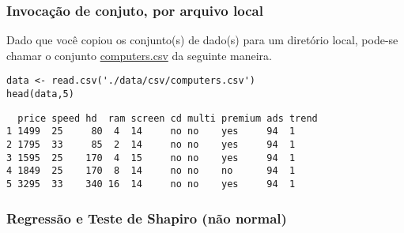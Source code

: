 \documentclass[11pt]{article}
\begin{document}
\subsubsection{Invocação de conjuto, por arquivo local}
\label{sec:org6b4a1f4}

Dado que você copiou os conjunto(s) de dado(s) para um diretório
local, pode-se chamar o conjunto \href{https://drive.google.com/file/d/1C1-9aM-dYzx7UQrWq\_gg4DRw6wtj-l7Z/view?usp=sharing}{computers.csv} da seguinte maneira.

\begin{verbatim}
data <- read.csv('./data/csv/computers.csv')
head(data,5)
\end{verbatim}

\begin{verbatim}
  price speed hd  ram screen cd multi premium ads trend
1 1499  25     80  4  14     no no    yes     94  1    
2 1795  33     85  2  14     no no    yes     94  1    
3 1595  25    170  4  15     no no    yes     94  1    
4 1849  25    170  8  14     no no    no      94  1    
5 3295  33    340 16  14     no no    yes     94  1    
\end{verbatim}

\subsubsection{Regressão e Teste de Shapiro (não normal)}
\label{sec:orgfd92704}
\end{document}

